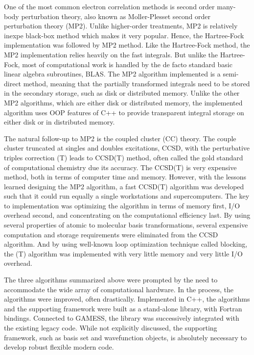\documentclass[12pt]{article} \usepackage[margin=1in]{geometry}
\begin{document}
One of the most common electron correlation methods is second order
many-body perturbation theory, also known as Moller-Plesset second
order perturbation theory (MP2).  Unlike higher-order treatments,
MP2 is relatively inexpe black-box method  which makes it very
popular.  Hence, the Hartree-Fock implementation was followed by MP2
method.  Like the Hartree-Fock method, the MP2  implementation relies
heavily on the fast integrals.  But unlike the Hartree-Fock, most of
computational work is handled by the de facto standard basic linear algebra
subroutines, BLAS.   The MP2 algorithm implemented is a semi-direct
method, meaning that the partially transformed integrals need to be stored
in the secondary storage, such as disk or distributed memory.   Unlike
the other MP2 algorithms, which are either disk or distributed
memory, the implemented algorithm uses OOP features of C++ to provide
transparent integral storage on either disk or in  distributed memory.

The natural follow-up to MP2 is the coupled cluster (CC) theory.
The couple cluster truncated at singles and doubles excitations, CCSD,
with the perturbative triples correction (T) leads to CCSD(T) method,
often called the gold standard of computational chemistry due its
accuracy.  The CCSD(T)  is very expensive method, both in terms of
computer time and memory.  However, with the lessons learned designing
the MP2 algorithm, a fast CCSD(T) algorithm was developed such that it
could run equally a single workstations and supercomputers.
The key to implementation was optimizing the algorithm in terms of
memory first, I/O overhead second, and concentrating on the
computational efficiency last.  By using several properties of atomic
to molecular basis transformations, several expensive computation and
storage requirements were eliminated from the CCSD algorithm.  And by
using well-known loop optimization technique called blocking, the (T)
algorithm was implemented with very little memory and very little I/O
overhead.

The three algorithms summarized above were prompted by
the need to accommodate the wide array of computational hardware.  In
the process, the algorithms were improved, often drastically.
Implemented in C++, the algorithms and the supporting framework were
built as a stand-alone library, with Fortran bindings.  Connected to
GAMESS, the library was successively integrated with the existing
legacy code.  While not explicitly discussed, the supporting
framework, such as basis set and wavefunction objects, is absolutely
necessary to develop robust flexible modern code.


% 
% 
\end{document}
